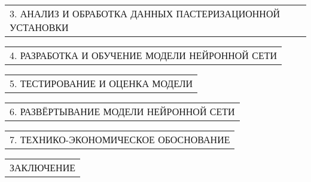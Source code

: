 \documentclass[12pt, А4, twoside]{article}
\begin{document}
\begin{FlushLeft}
    \begin{tabular}{p{17.25cm}} 
        \hspace{0.3cm} \textsf{3. АНАЛИЗ И ОБРАБОТКА ДАННЫХ ПАСТЕРИЗАЦИОННОЙ УСТАНОВКИ} \vspace{0pt} \hline \\
    \end{tabular}    

    \vspace{-0.1 cm}

    \begin{tabular}{p{17.25cm}} 
        \hspace{0.3cm} \textsf{4. РАЗРАБОТКА И ОБУЧЕНИЕ МОДЕЛИ НЕЙРОННОЙ СЕТИ} \vspace{0pt} \hline \\
    \end{tabular}  

    \vspace{-0.1 cm}

    \begin{tabular}{p{17.25cm}} 
        \hspace{0.3cm} \textsf{5. ТЕСТИРОВАНИЕ И ОЦЕНКА МОДЕЛИ} \vspace{0pt} \hline \\
    \end{tabular} 

    \vspace{-0.1 cm}

    \begin{tabular}{p{17.25cm}} 
        \hspace{0.3cm} \textsf{6. РАЗВЁРТЫВАНИЕ МОДЕЛИ НЕЙРОННОЙ СЕТИ} \vspace{0pt} \hline \\
    \end{tabular}  

    \vspace{-0.1 cm}

    \begin{tabular}{p{17.25cm}} 
        \hspace{0.3cm} \textsf{7. ТЕХНИКО-ЭКОНОМИЧЕСКОЕ ОБОСНОВАНИЕ} \vspace{1pt} \hline \\
    \end{tabular}  

    \vspace{-0.1 cm}

    \begin{tabular}{p{17.25cm}} 
        \textsf{ЗАКЛЮЧЕНИЕ} \vspace{1pt} \hline \\
    \end{tabular}  


\end{FlushLeft}
\end{document}
